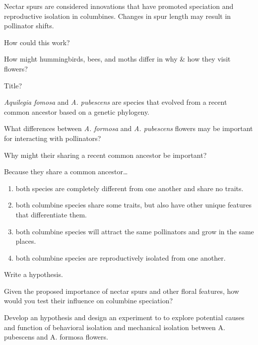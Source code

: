 \documentclass[t]{beamer}
\newcommand{\ques}[1]{\highlight{\textsc{q#1:}}}
\begin{document}
%
\begin{frame}[t]
	
	\hangpara Nectar spurs are considered innovations that have promoted speciation and reproductive isolation in columbines. Changes in spur length may result in pollinator shifts.

	\hangpara How could this work? 

	\hangpara How might hummingbirds, bees, and moths differ in why \& how they visit flowers? 

\end{frame}
%
\begin{frame}[t]{Title?}
	
	\hangpara \textit{Aquilegia fomosa} and \textit{A. pubescens} are species that evolved from a recent common ancestor based on a genetic phylogeny. 
	
	\hangpara What differences between \textit{A. formosa} and \textit{A. pubescens} flowers may be important for interacting with pollinators?
	
	\hangpara Why might their sharing a recent common ancestor be important?

\end{frame}
%
\begin{frame}[t]{\ques8 Because they share a common ancestor\dots}
	
	\begin{enumerate}
		\item both species are completely different from one another and share no traits. 
		
		\item both columbine species share some traits, but also have other unique features that differentiate them.
		
		\item both columbine species will attract the same pollinators and grow in the same places.
		
		\item both columbine species are reproductively isolated from one another.
	\end{enumerate}
\end{frame}
%
\begin{frame}[t]{Write a hypothesis.}
	
	\hangpara Given the proposed importance of nectar spurs and other floral features, how would you test their influence on columbine speciation?

	\hangpara Develop an hypothesis and design an experiment to  to explore potential causes and function of behavioral isolation and mechanical isolation between A. pubescens and A. formosa flowers.

\end{frame}
\end{document}
